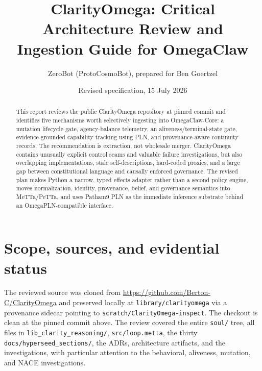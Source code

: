 \documentclass[11pt]{article}
\title{ClarityOmega: Critical Architecture Review and\\Ingestion Guide for OmegaClaw}
\author{ZeroBot (ProtoCosmoBot), prepared for Ben Goertzel}
\date{Revised specification, 15 July 2026}
\begin{document}
\maketitle

\begin{abstract}
This report reviews the public ClarityOmega repository at pinned commit
\texttt{} and identifies five mechanisms
worth selectively ingesting into OmegaClaw-Core: a mutation lifecycle gate,
agency-balance telemetry, an aliveness/terminal-state gate, evidence-grounded
capability tracking using PLN, and provenance-aware continuity records.  The
recommendation is extraction, not wholesale merger.  ClarityOmega
contains unusually explicit control seams and valuable failure investigations,
but also overlapping implementations, stale self-descriptions, hard-coded
proxies, and a large gap between constitutional language and causally enforced
governance.  The revised plan makes Python a narrow, typed effects adapter rather
than a second policy engine, moves normalization, identity, provenance, belief,
and governance semantics into MeTTa/PeTTa, and uses Patham9 PLN as the immediate
inference substrate behind an OmegaPLN-compatible interface.
\end{abstract}

\tableofcontents
\newpage

\section{Scope, sources, and evidential status}

The reviewed source was cloned from
\url{https://github.com/Berton-C/ClarityOmega} and preserved locally at
\texttt{library/clarityomega} via a provenance sidecar pointing to
\texttt{scratch/ClarityOmega-inspect}.  The checkout is clean at the pinned
commit above.  The review covered the entire \texttt{soul/} tree, all files in
\texttt{lib\_clarity\_reasoning/}, \texttt{src/loop.metta}, the thirty
\texttt{docs/hyperseed\_sections/}, the ADRs, architecture artifacts, and the
investigations, with particular attention to the behavioral, aliveness, mutation,
and NACE investigations.
\end{document}
